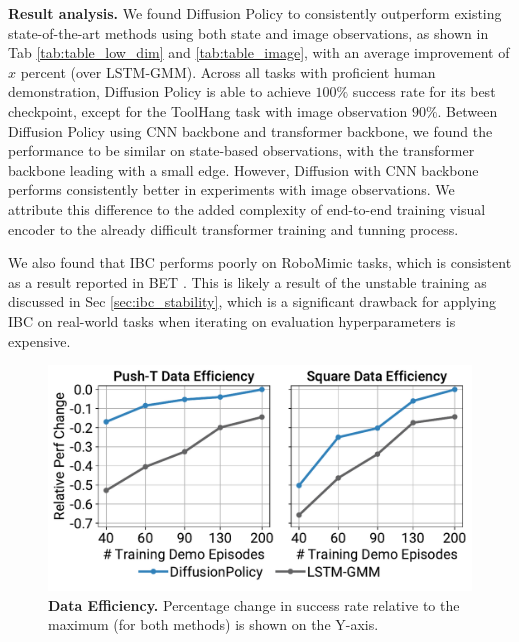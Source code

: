  \textbf{Result analysis.} We found Diffusion Policy to consistently outperform existing state-of-the-art methods using both state and image observations, as shown in Tab \ref{tab:table_low_dim} and \ref{tab:table_image}, with an average improvement of $x$ percent (over LSTM-GMM). Across all tasks with proficient human demonstration, Diffusion Policy is able to achieve $100\% $ success rate for its best checkpoint, except for the ToolHang task with image observation $90\% $. 
 Between Diffusion Policy using CNN backbone and transformer backbone, we found the performance to be similar on state-based observations, with the transformer backbone leading with a small edge. However, Diffusion with CNN backbone performs consistently better in experiments with image observations. We attribute this difference to the added complexity of end-to-end training visual encoder to the already difficult transformer training and tunning process. %

We also found that IBC \cite{ibc} performs poorly on RoboMimic tasks, which is consistent as a result reported in BET \cite{bet}. This is likely a result of the unstable training as discussed in Sec \ref{sec:ibc_stability}, which is a significant drawback for applying IBC on real-world tasks when iterating on evaluation hyperparameters is expensive.


\begin{figure}[h]
\centering
\includegraphics[width=\linewidth]{figure/sample_efficiency_figure.pdf}

\caption{\textbf{Data Efficiency.} 
\label{fig:data_efficiency}
Percentage change in success rate relative to the maximum (for both methods) is shown on the Y-axis.
}
\end{figure}


